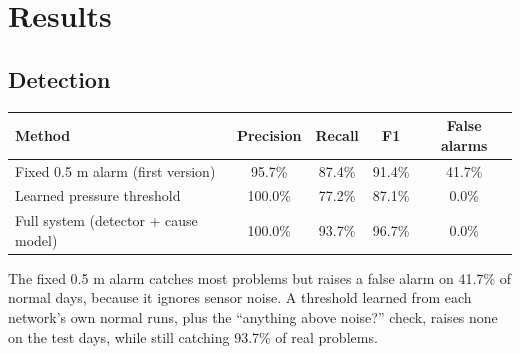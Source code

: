 \documentclass[11pt,a4paper]{article}
\begin{document}
\section{Results}
\subsection{Detection}
\begin{center}\small\begin{tabular}{@{}lcccc@{}}\toprule
Method & Precision & Recall & F1 & False alarms \\\midrule
Fixed 0.5 m alarm (first version) & 95.7\% & 87.4\% & 91.4\% & 41.7\% \\
Learned pressure threshold & 100.0\% & 77.2\% & 87.1\% & 0.0\% \\
Full system (detector + cause model) & 100.0\% & 93.7\% & 96.7\% & 0.0\% \\
\bottomrule\end{tabular}\end{center}
The fixed 0.5 m alarm catches most problems but raises a false alarm on 41.7\% of normal days, because it ignores sensor noise. A threshold learned from each network's own normal runs, plus the ``anything above noise?'' check, raises none on the test days, while still catching 93.7\% of real problems.
\end{document}
